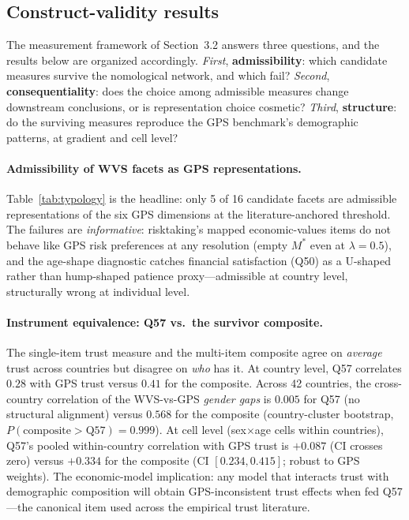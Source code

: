 \documentclass[11pt,letterpaper]{article}
\begin{document}
\subsection{Construct-validity results}

The measurement framework of Section~3.2 answers three questions, and the results below are organized accordingly. \emph{First}, \textbf{admissibility}: which candidate measures survive the nomological network, and which fail? \emph{Second}, \textbf{consequentiality}: does the choice among admissible measures change downstream conclusions, or is representation choice cosmetic? \emph{Third}, \textbf{structure}: do the surviving measures reproduce the GPS benchmark's demographic patterns, at gradient and cell level?

\paragraph{Admissibility of WVS facets as GPS representations.}
Table~\ref{tab:typology} is the headline: only 5 of 16 candidate facets are admissible representations of the six GPS dimensions at the literature-anchored threshold. The failures are \emph{informative}: risktaking's mapped economic-values items do not behave like GPS risk preferences at any resolution (empty $M^*$ even at $\lambda=0.5$), and the age-shape diagnostic catches financial satisfaction (Q50) as a U-shaped rather than hump-shaped patience proxy---admissible at country level, structurally wrong at individual level.

\paragraph{Instrument equivalence: Q57 vs.\ the survivor composite.}
The single-item trust measure and the multi-item composite agree on \emph{average} trust across countries but disagree on \emph{who} has it. At country level, Q57 correlates $0.28$ with GPS trust versus $0.41$ for the composite. Across 42 countries, the cross-country correlation of the WVS-vs-GPS \emph{gender gaps} is $0.005$ for Q57 (no structural alignment) versus $0.568$ for the composite (country-cluster bootstrap, $P(\text{composite} > \text{Q57}) = 0.999$). At cell level (sex$\times$age cells within countries), Q57's pooled within-country correlation with GPS trust is $+0.087$ (CI crosses zero) versus $+0.334$ for the composite (CI $[0.234, 0.415]$; robust to GPS weights). The economic-model implication: any model that interacts trust with demographic composition will obtain GPS-inconsistent trust effects when fed Q57---the canonical item used across the empirical trust literature.
\end{document}
